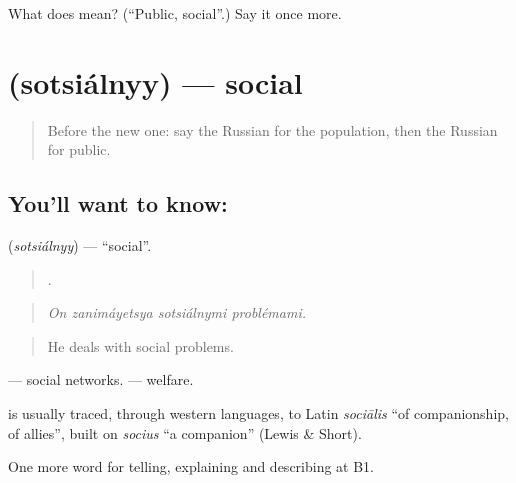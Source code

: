 \begin{tcolorbox}[breakable,colback=teal!4,colframe=teal!35!black,title={Before you move on}]
What does  mean? (\textquotedblleft{}Public, social\textquotedblright{}.) Say it once more.
\end{tcolorbox}
\section[\texorpdfstring{\ru{социальный} (sotsiálnyy)}{социальный (sotsiálnyy)}]{ (sotsiálnyy) — social}

\label{lesson:RU-C364-socialnyy}



\begin{quote}
Before the new one: say the Russian for the population, then the Russian for public.
\end{quote}

\subsection*{You'll want to know: }
\textbf{} (\emph{sotsiálnyy}) — \textquotedblleft{}social\textquotedblright{}.

\begin{quote}
   .
\end{quote}

\begin{quote}
\emph{On zanimáyetsya sotsiálnymi problémami.}
\end{quote}

\begin{quote}
He deals with social problems.
\end{quote}

\emph{ } — social networks. \emph{ } — welfare.

\begin{cousinweb}
\textbf{} is usually traced, through western languages, to Latin \emph{sociālis} \textquotedblleft{}of companionship, of allies\textquotedblright{}, built on \emph{socius} \textquotedblleft{}a companion\textquotedblright{} (Lewis \& Short).
\end{cousinweb}

\begin{grammarlens}[title={What you've built}]
One more word for telling, explaining and describing at B1.
\end{grammarlens}

